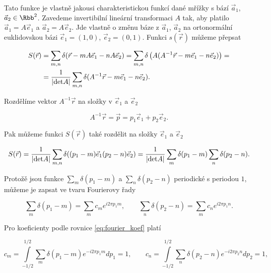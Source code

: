 Tato funkce je vlastně jakousi charakteristickou funkcí dané mřížky s bází $\vec{a}_1$, $\vec{a}_2 \in \Rbb^2$. Zavedeme invertibilní lineární transformaci $A$ tak, aby platilo $\vec{a}_1 = A \vec{e}_1$ a $\vec{a}_2 = A\vec{e}_2$. Jde vlastně o změnu báze z $\vec{a}_1$, $\vec{a}_2$ na ortonormální euklidovskou bázi $\vec{e}_1 = (1,0)$, $\vec{e}_2 = (0,1)$. Funkci $s(\vec{r})$ můžeme přepsat

\begin{equation}
\begin{aligned}
S(\vec{r})& = \sum\limits_{m,n} \delta(\vec{r}-m A \vec{e}_1 - n A \vec{e}_2) = \sum\limits_{m,n} \delta\left(A(A^{-1}\vec{r}-m\vec{e}_1 - n\vec{e}_2)\right) = \\
& = \frac{1}{|{\rm det}A|} \sum\limits_{m,n} \delta(A^{-1}\vec{r}-m\vec{e}_1 - n\vec{e}_2).
\end{aligned}
\end{equation}

Rozdělíme vektor $A^{-1}\vec{r}$ na složky v $\vec{e}_1$ a $\vec{e}_2$

\begin{equation}
A^{-1}\vec{r} = \vec{p} = p_1 \vec{e}_1 + p_2 \vec{e}_2.
\end{equation} 

Pak můžeme funkci $S(\vec{r})$ také rozdělit na složky $\vec{e}_1$ a $\vec{e}_2$

\begin{equation}
S(\vec{r}) = \frac{1}{|{\rm det}A|} \sum\limits_{m,n} \delta((p_1-m)\vec{e}_1 (p_2-n)\vec{e}_2) = \frac{1}{|{\rm det}A|} \sum\limits_{m} \delta(p_1-m) \sum\limits_{n}  \delta(p_2-n).
\end{equation}

Protožě jsou funkce $\sum\limits_{m}\delta(p_1-m)$ a $ \sum\limits_{n}\delta(p_2-n)$ periodické s periodou $1$, můžeme je zapsat ve tvaru Fourierovy řady

\begin{equation}
\sum\limits_{m}\delta(p_1-m) = \sum\limits_{m} c_m e^{i 2 \pi p_1 m}, \qquad \sum\limits_{n} \delta(p_2-n) = \sum\limits_{m} c_n e^{i 2 \pi p_1 n}.
\end{equation}

Pro koeficienty podle rovnice \eqref{eq:fourier_koef} platí

\begin{equation}
c_m = \int\limits_{-1/2}^{1/2} \sum\limits_{m} \delta(p_1-m) e^{-i 2 \pi p_1 m} d p_1 = 1, \qquad c_n = \int\limits_{-1/2}^{1/2} \sum\limits_{n} \delta(p_2-n) e^{-i 2 \pi p_2 n} d p_2 = 1,
\end{equation}

